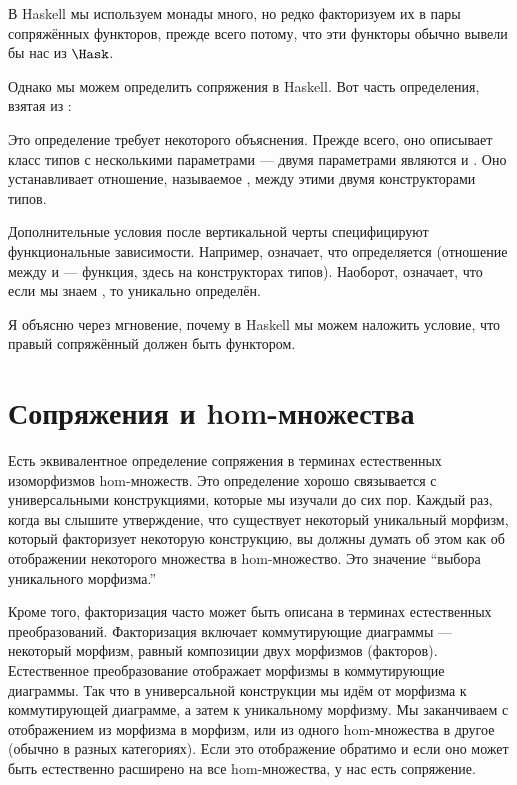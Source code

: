 В Haskell мы используем монады много, но редко факторизуем их в
пары сопряжённых функторов, прежде всего потому, что эти функторы обычно
вывели бы нас из $\Hask$.

Однако мы можем определить сопряжения  в Haskell.
Вот часть определения, взятая из
:

Это определение требует некоторого объяснения. Прежде всего, оно описывает
класс типов с несколькими параметрами --- двумя параметрами являются  и
. Оно устанавливает отношение, называемое , между
этими двумя конструкторами типов.

Дополнительные условия после вертикальной черты специфицируют функциональные
зависимости. Например,  означает, что
 определяется  (отношение между 
и  --- функция, здесь на конструкторах типов). Наоборот,
 означает, что если мы знаем , то
 уникально определён.

Я объясню через мгновение, почему в Haskell мы можем наложить условие,
что правый сопряжённый  должен быть  функтором.

\section{Сопряжения и hom-множества}

Есть эквивалентное определение сопряжения в терминах естественных
изоморфизмов hom-множеств. Это определение хорошо связывается с универсальными
конструкциями, которые мы изучали до сих пор. Каждый раз, когда вы слышите
утверждение, что существует некоторый уникальный морфизм, который факторизует некоторую
конструкцию, вы должны думать об этом как об отображении некоторого множества в
hom-множество. Это значение ``выбора уникального морфизма.''

Кроме того, факторизация часто может быть описана в терминах естественных
преобразований. Факторизация включает коммутирующие диаграммы --- некоторый
морфизм, равный композиции двух морфизмов (факторов).
Естественное преобразование отображает морфизмы в коммутирующие диаграммы. Так что в
универсальной конструкции мы идём от морфизма к коммутирующей диаграмме,
а затем к уникальному морфизму. Мы заканчиваем с отображением из морфизма в
морфизм, или из одного hom-множества в другое (обычно в разных
категориях). Если это отображение обратимо и если оно может быть естественно
расширено на все hom-множества, у нас есть сопряжение.

